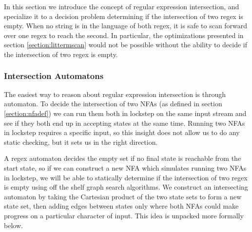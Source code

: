 In this section we introduce the concept of regular expression
intersection, and specialize it to a decision problem determining
if the intersection of two regex is empty.
When no string is in the language of both regex, it is
safe to scan forward over one regex to reach the second.
In particular, the optimizations presented in section
\ref{section:littermscan} would not be possible without
the ability to decide if the intersection of two regex is empty.

\subsubsection{Intersection Automatons}

The easiest way to reason about regular expression intersection
is through automaton. To decide the intersection of two NFAs
(as defined in section \ref{section:nfadef}) we
can run them both in lockstep on the same input stream
and see if they both end up in accepting states at the same time.
Running two NFAs in lockstep requires a specific input, so this insight
does not allow us to do any static checking, but it sets us in the
right direction.

A regex automaton decides the empty set if no final state is reachable
from the start state, so if we can construct a new NFA which simulates
running two NFAs in lockstep, we will be able to statically determine
if the intersection of two regex is empty using off the shelf graph
search algorithms. We construct an
intersecting automaton by taking the Cartesian product
of the two state sets to form a new state set, then adding edges
between states only where both NFAs could make progress on a particular
character of input. This idea is unpacked more formally below.

